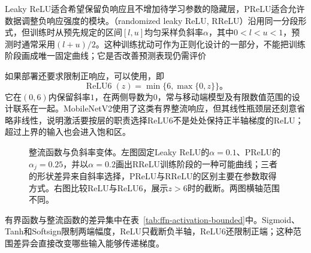 Leaky ReLU适合希望保留负响应且不增加待学习参数的隐藏层，PReLU适合允许数据调整负响应强度的模块。（randomized leaky ReLU, RReLU）沿用同一分段形式，但训练时从预先规定的区间$[l,u]$均匀采样负斜率$\alpha$，其中$0<l<u<1$，预测时通常采用$(l+u)/2$。这种训练扰动可作为正则化设计的一部分，不能把训练阶段画成唯一固定曲线；它是否改善预测表现仍需评价

如果部署还要求限制正响应，可以使用，即
\begin{equation}
  \operatorname{ReLU6}(z)=\min\{6,\max\{0,z\}\}\text{。}
  \label{eq:ffn-relu6}
\end{equation}
它在$(0,6)$内保留斜率$1$，在两侧导数为$0$，常与移动端模型及有限数值范围的设计联系在一起。MobileNetV2使用了这类有界整流响应，但其线性瓶颈层还刻意省略非线性，说明激活要按层的职责选择ReLU6不是处处保持正半轴梯度的ReLU；超过上界的输入也会进入饱和区。

\begin{figure}[htb]
  \centering
  
  \caption{整流函数与负斜率变体。左图固定Leaky ReLU的$\alpha=0.1$、PReLU的$\alpha_j=0.25$，并以$\alpha=0.2$画出RReLU训练阶段的一种可能曲线；三者的形状差异来自斜率选择，PReLU与RReLU的区别主要在参数取得方式。右图比较ReLU与ReLU6，展示$z>6$时的截断。两图横轴范围不同。}
  \label{fig:ffn-activation-rectifiers}
\end{figure}

有界函数与整流函数的差异集中在表~\ref{tab:ffn-activation-bounded}中。Sigmoid、Tanh和Softsign限制两端幅度，ReLU只截断负半轴，ReLU6还限制正端；这种范围差异会直接改变哪些输入能够传递梯度。

